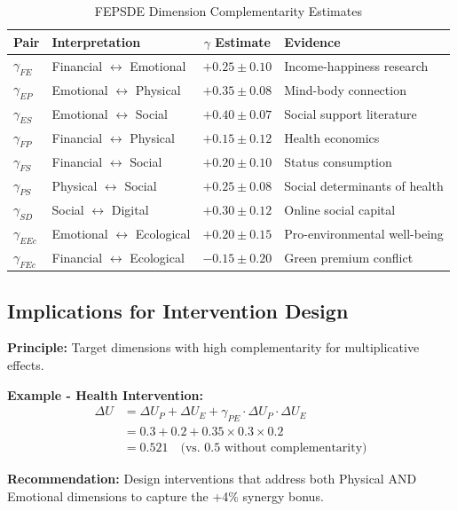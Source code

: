 \begin{table}[h]
\centering
\caption{FEPSDE Dimension Complementarity Estimates}
\label{tab:fepsde-gamma}
\renewcommand{\arraystretch}{1.2}
\small
\begin{tabular}{@{}llcl@{}}
\toprule
\textbf{Pair} & \textbf{Interpretation} & \textbf{$\gamma$ Estimate} & \textbf{Evidence} \\
\midrule
$\gamma_{FE}$ & Financial $\leftrightarrow$ Emotional & $+0.25 \pm 0.10$ & Income-happiness research \\
$\gamma_{EP}$ & Emotional $\leftrightarrow$ Physical & $+0.35 \pm 0.08$ & Mind-body connection \\
$\gamma_{ES}$ & Emotional $\leftrightarrow$ Social & $+0.40 \pm 0.07$ & Social support literature \\
$\gamma_{FP}$ & Financial $\leftrightarrow$ Physical & $+0.15 \pm 0.12$ & Health economics \\
$\gamma_{FS}$ & Financial $\leftrightarrow$ Social & $+0.20 \pm 0.10$ & Status consumption \\
$\gamma_{PS}$ & Physical $\leftrightarrow$ Social & $+0.25 \pm 0.08$ & Social determinants of health \\
$\gamma_{SD}$ & Social $\leftrightarrow$ Digital & $+0.30 \pm 0.12$ & Online social capital \\
$\gamma_{EEc}$ & Emotional $\leftrightarrow$ Ecological & $+0.20 \pm 0.15$ & Pro-environmental well-being \\
$\gamma_{FEc}$ & Financial $\leftrightarrow$ Ecological & $-0.15 \pm 0.20$ & Green premium conflict \\
\bottomrule
\end{tabular}
\end{table}

\subsection{Implications for Intervention Design}

\begin{tcolorbox}[colback=green!5!white,colframe=green!75!black,title=\textbf{Design Principle: Multi-Dimensional Targeting}]
\textbf{Principle:} Target dimensions with high complementarity for multiplicative effects.

\textbf{Example - Health Intervention:}
\begin{align}
\Delta U &= \Delta U_P + \Delta U_E + \gamma_{PE} \cdot \Delta U_P \cdot \Delta U_E \\
&= 0.3 + 0.2 + 0.35 \times 0.3 \times 0.2 \\
&= 0.521 \quad \text{(vs. 0.5 without complementarity)}
\end{align}

\textbf{Recommendation:} Design interventions that address both Physical AND Emotional dimensions to capture the +4\% synergy bonus.
\end{tcolorbox}

